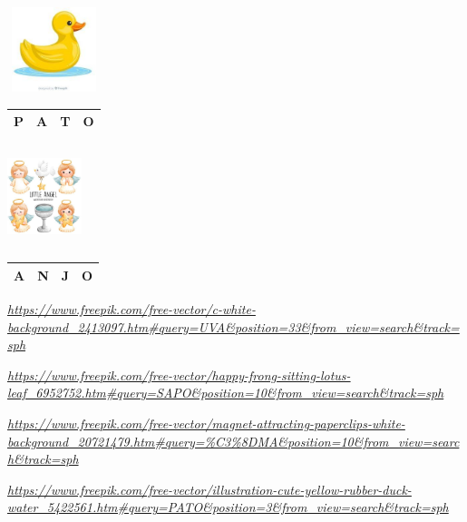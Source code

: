 \includegraphics[width=1.07292in,height=0.97005in]{media/image41.jpg}

\begin{longtable}[]{@{}llll@{}}
\toprule
P & A & T & O\tabularnewline
\bottomrule
\end{longtable}

\includegraphics[width=0.85417in,height=1.14167in]{media/image42.jpg}

\begin{longtable}[]{@{}llll@{}}
\toprule
A & N & J & O\tabularnewline
\bottomrule
\end{longtable}

\href{https://www.freepik.com/free-vector/c-white-background_2413097.htm\#query=UVA\&position=33\&from_view=search\&track=sph}{\emph{https://www.freepik.com/free-vector/c-white-background\_2413097.htm\#query=UVA\&position=33\&from\_view=search\&track=sph}}

\href{https://www.freepik.com/free-vector/happy-frong-sitting-lotus-leaf_6952752.htm\#query=SAPO\&position=10\&from_view=search\&track=sph}{\emph{https://www.freepik.com/free-vector/happy-frong-sitting-lotus-leaf\_6952752.htm\#query=SAPO\&position=10\&from\_view=search\&track=sph}}

\href{https://www.freepik.com/free-vector/magnet-attracting-paperclips-white-background_20721479.htm\#query=\%C3\%8DMA\&position=10\&from_view=search\&track=sph}{\emph{https://www.freepik.com/free-vector/magnet-attracting-paperclips-white-background\_20721479.htm\#query=\%C3\%8DMA\&position=10\&from\_view=search\&track=sph}}

\href{https://www.freepik.com/free-vector/illustration-cute-yellow-rubber-duck-water_5422561.htm\#query=PATO\&position=3\&from_view=search\&track=sph}{\emph{https://www.freepik.com/free-vector/illustration-cute-yellow-rubber-duck-water\_5422561.htm\#query=PATO\&position=3\&from\_view=search\&track=sph}}


